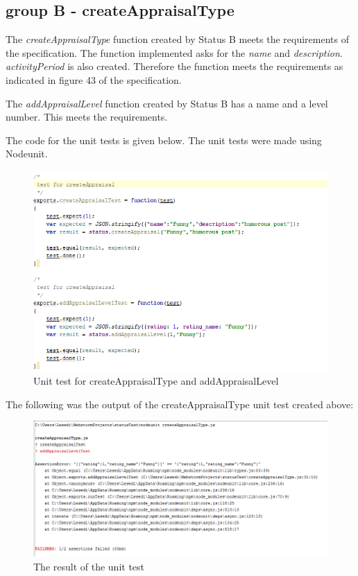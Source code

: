 \documentclass[a4paper,12pt]{article}
\begin{document}
\subsection{group B - createAppraisalType}

The \textit{createAppraisalType} function created by Status B meets the requirements of the specification. The function implemented asks for the \textit{name} and \textit{description}. \textit{activityPeriod} is also created. Therefore the function meets the requirements as indicated in figure 43 of the specification.

The \textit{addAppraisalLevel} function created by Status B has a name and a level number. This meets the requirements.

The code for the unit tests is given below. The unit tests were made using Nodeunit.

\begin{figure}[H]
		\centering
		\includegraphics[width=1.0\textwidth]{Figures/createAppraisalTypeUnitTests.png}
		\caption{Unit test for createAppraisalType and addAppraisalLevel}
	\end{figure}

The following was the output of the createAppraisalType unit test created above:
\begin{figure}[H]
		\centering
		\includegraphics[width=1.0\textwidth]{Figures/createAppraisalTypeUnitTestsResult.png}
		\caption{The result of the unit test}
	\end{figure}
	
\end{document}
